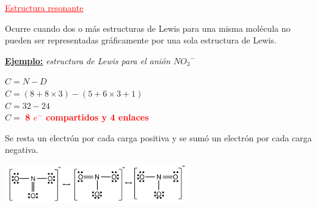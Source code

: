         \begin{center} \textcolor{red}{\underline{Estructura resonante}} \end{center}
        \sangria{} Ocurre cuando dos o más estructuras de Lewis para una misma molécula no pueden ser representadas gráficamente por una sola estructura de Lewis. 
        \columnbreak{}
        \begin{center} \textbf{\underline{Ejemplo:}} \textit{estructura de Lewis para el anión ${NO_3}^{-}$} \end{center}
        \begin{center}
            $C = N -D$ \\
            $C = (8 + 8 \times 3) - (5 + 6 \times 3 + 1)$ \\
            $C = 32 - 24$ \\
            $C =$ \textcolor{red}{\textbf{8 $e^-$ compartidos y 4 enlaces}}
        \end{center}
        \sangria{} Se resta un electrón por cada carga positiva y se sumó un electrón por cada carga negativa.
        \begin{center} \includegraphics[width=8cm]{./imagenes/estructuraResonanteNO3-.png} \end{center}


